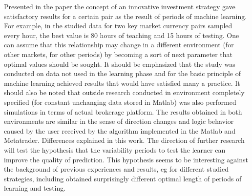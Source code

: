 \documentclass[runningheads,a4paper]{llncs}
\begin{document}
Presented in the paper the concept of an innovative investment strategy gave satisfactory results for a certain pair as the result of periods of machine learning. For example, in the studied data for two key market currency pairs sampled every hour, the best value is 80 hours of teaching and 15 hours of testing. One can assume that this relationship may change in a different environment (for other markets, for other periods) by becoming a sort of next parameter that optimal values should be sought. It should be emphasized that the study was conducted on data not used in the learning phase and for the basic principle of machine learning achieved results that would have satisfied many a practice. It should also be noted that outside research conducted in environment completely specified (for constant unchanging data stored in Matlab) was also performed simulations in terms of actual brokerage platform. The results obtained in both environments are similar in the sense of direction changes and logic behavior caused by the user received by the algorithm implemented in the Matlab and Metatrader. Differences explained in this work.
The direction of further research will test the hypothesis that the variability periods to test the learner can improve the quality of prediction. This hypothesis seems to be interesting against the background of previous experiences and results, eg for different studied strategies, including \cite{Wilinski2014} obtained surprisingly different optimal length of periods of learning and testing.
\cite{burke}\cite{hay}\cite{krutsinger}\cite{lewis}\cite{murphy}\cite{provost}\cite{wang}\cite{sinclare}\cite{person}\cite{myers}\cite{tian}





\end{document}
